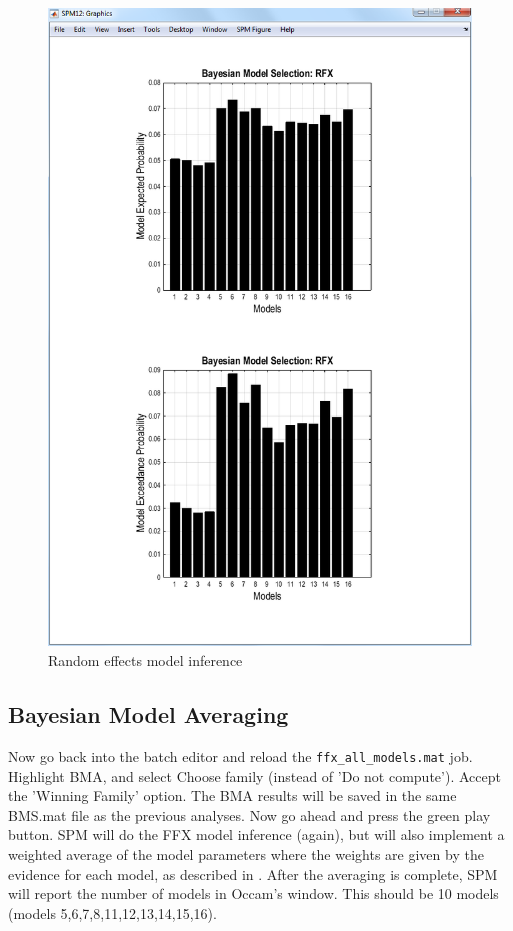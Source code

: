 \begin{figure}
\begin{center}
\includegraphics[width=150mm]{bms/Slide3.png}
\caption{Random effects model inference\label{rfx_model}}
\end{center}
\end{figure}

\subsection{Bayesian Model Averaging}

Now go back into the batch editor and reload the \verb!ffx_all_models.mat! job.
Highlight BMA, and select Choose family (instead of 'Do not compute'). Accept the 'Winning Family' option. The BMA results will be saved in the same BMS.mat file as the previous analyses. Now go ahead and press the green play button.
SPM will do the FFX model inference (again), but will also implement a weighted average of the model parameters where the weights are given by the evidence for each model, as described in \cite{dcm_families}. After the averaging is complete, SPM will report the number of models in Occam's window. This should be 10 models (models 5,6,7,8,11,12,13,14,15,16). 

